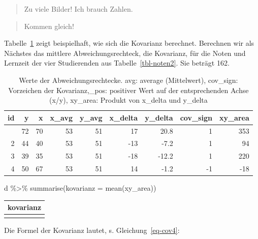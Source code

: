 \documentclass[
  letterpaper,
  oneside,
  open=any]{scrbook}
\newenvironment{Shaded}{\begin{snugshade}}{\end{snugshade}}
\newcommand{\AttributeTok}[1]{\textcolor[rgb]{0.40,0.45,0.13}{#1}}
\newcommand{\FunctionTok}[1]{\textcolor[rgb]{0.28,0.35,0.67}{#1}}
\newcommand{\NormalTok}[1]{\textcolor[rgb]{0.00,0.23,0.31}{#1}}
\newcommand{\SpecialCharTok}[1]{\textcolor[rgb]{0.37,0.37,0.37}{#1}}
\theoremstyle{definition}
\theoremstyle{definition}
\theoremstyle{definition}
\theoremstyle{remark}
\begin{document}
\begin{quote}
{} Zu viele Bilder! Ich brauch Zahlen.
\end{quote}

\begin{quote}
{} Kommen gleich!
\end{quote}

Tabelle~\ref{tbl-kov2} zeigt beispielhaft, wie sich die Kovarianz
berechnet. Berechnen wir als Nächstes das mittlere Abweichungsrechteck,
die Kovarianz, für die Noten und Lernzeit der vier Studierenden aus
Tabelle~\ref{tbl-noten2}. Sie beträgt 162.

\begin{longtable}[]{@{}rrrrrrrrr@{}}

\caption{\label{tbl-kov2}Werte der Abweichungsrechtecke. avg: average
(Mittelwert), cov\_sign: Vorzeichen der Kovarianz,\_pos: positiver Wert
auf der entsprechenden Achse (x/y), xy\_area: Produkt von x\_delta und
y\_delta}

\tabularnewline

\toprule\noalign{}
id & y & x & x\_avg & y\_avg & x\_delta & y\_delta & cov\_sign &
xy\_area \\
\midrule\noalign{}
\endhead
\bottomrule\noalign{}
\endlastfoot
1 & 72 & 70 & 53 & 51 & 17 & 20.8 & 1 & 353 \\
2 & 44 & 40 & 53 & 51 & -13 & -7.2 & 1 & 94 \\
3 & 39 & 35 & 53 & 51 & -18 & -12.2 & 1 & 220 \\
4 & 50 & 67 & 53 & 51 & 14 & -1.2 & -1 & -18 \\

\end{longtable}

\begin{Shaded}
\begin{Highlighting}[]
\NormalTok{d }\SpecialCharTok{\%\textgreater{}\%}
  \FunctionTok{summarise}\NormalTok{(}\AttributeTok{kovarianz =} \FunctionTok{mean}\NormalTok{(xy\_area))}
\end{Highlighting}
\end{Shaded}

\begin{longtable}[]{@{}r@{}}
\toprule\noalign{}
kovarianz \\
\midrule\noalign{}
\endhead
\bottomrule\noalign{}
\endlastfoot
162 \\
\end{longtable}

Die Formel der Kovarianz lautet, s. Gleichung~\ref{eq-cov4}:
\end{document}
